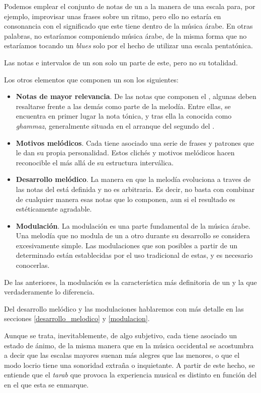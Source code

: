 Podemos emplear el conjunto de notas de un \maqam a la manera de una escala para, por ejemplo, improvisar unas frases sobre un ritmo, pero ello no estaría en consonancia con el significado que este tiene dentro de la música árabe. En otras palabras, no estaríamos componiendo música árabe, de la misma forma que no estaríamos tocando un \emph{blues} solo por el hecho de utilizar una escala pentatónica.

Las notas e intervalos de un \maqam son solo un parte de este, pero no su totalidad.

Los otros elementos que componen un \maqam son los siguientes:

\begin{itemize}
\item \textbf{Notas de mayor relevancia}. De las notas que componen el \maqam, algunas deben resaltarse frente a las demás como parte de la melodía. Entre ellas, se encuentra en primer lugar la nota tónica, y tras ella la conocida como \emph{ghammaz}, generalmente situada en el arranque del segundo \yins del \maqamb.
\item \textbf{Motivos melódicos}. Cada \maqam tiene asociado una serie de frases y patrones que le dan su propia personalidad. Estos clichés y motivos melódicos hacen reconocible el \maqam más allá de su estructura interválica.
\item \textbf{Desarrollo melódico}. La manera en que la melodía evoluciona a traves de las notas del \maqam está definida  y no es arbitraria. Es decir, no basta con combinar de cualquier manera esas notas que lo componen, aun si el resultado es estéticamente agradable.
\item \textbf{Modulación}. La modulación es una parte fundamental de la música árabe. Una melodía que no modula de un \maqam a otro durante su desarrollo se considera excesivamente simple. Las modulaciones que son posibles a partir de un determinado \maqam están establecidas por el uso tradicional de estas, y es necesario conocerlas.
\end{itemize}

De las anteriores, la modulación es la característica más definitoria de un \maqam y la que verdaderamente lo diferencia.

Del desarrollo melódico y las modulaciones hablaremos con más detalle en las secciones \ref{desarrollo_melodico} y \ref{modulacion}.

Aunque se trata, inevitablemente, de algo subjetivo, cada \maqam tiene asociado un estado de ánimo, de la misma manera que en la música occidental se acostumbra a decir que las escalas mayores suenan más alegres que las menores, o que el modo locrio tiene una sonoridad extraña o inquietante. A partir de este hecho, se entiende que el \emph{tarab} que provoca la experiencia musical es distinto en función del \maqam en el que esta se enmarque.

